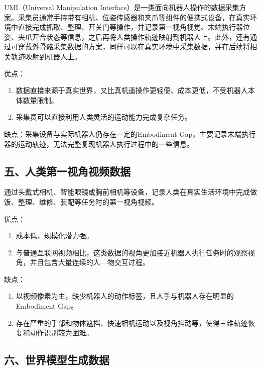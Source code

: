 UMI（Universal Manipulation Interface）是一类面向机器人操作的数据采集方案。采集员通常手持带有相机、位姿传感器和夹爪等组件的便携式设备，在真实环境中直接完成抓取、整理、开关门等操作，并记录第一视角视觉、末端执行器位姿、夹爪开合状态等信息，之后再将人类操作轨迹映射到机器人上。此外，还有通过可穿戴外骨骼采集数据的方案，同样可以在真实环境中采集数据，并在后续将相关轨迹映射到机器人上。

优点：

\begin{enumerate}
\def\labelenumi{\arabic{enumi}.}
\item
  数据直接来源于真实世界，又比真机遥操作更轻便、成本更低，不受机器人本体数量限制。
\item
  采集员可以直接利用人类灵活的运动能力完成复杂任务。
\end{enumerate}

缺点：采集设备与实际机器人仍存在一定的Embodiment Gap，主要记录末端执行器的运动轨迹，无法完整复现机器人执行过程中的一些信息。

\hypertarget{ux4e94ux4ebaux7c7bux7b2cux4e00ux89c6ux89d2ux89c6ux9891ux6570ux636e}{%
\subsection{五、人类第一视角视频数据}\label{ux4e94ux4ebaux7c7bux7b2cux4e00ux89c6ux89d2ux89c6ux9891ux6570ux636e}}

通过头戴式相机、智能眼镜或胸前相机等设备，记录人类在真实生活环境中完成做饭、整理、维修、装配等任务时的第一视角视频。

优点：

\begin{enumerate}
\def\labelenumi{\arabic{enumi}.}
\item
  成本低，规模化潜力强。
\item
  与普通互联网视频相比，这类数据的视角更加接近机器人执行任务时的观察视角，并且包含大量连续的人---物交互过程。
\end{enumerate}

缺点：

\begin{enumerate}
\def\labelenumi{\arabic{enumi}.}
\item
  以视频像素为主，缺少机器人的动作标签，且人手与机器人存在明显的Embodiment Gap。
\item
  存在严重的手部和物体遮挡、快速相机运动以及视角抖动等，使得三维轨迹恢复和动作识别较为困难。
\end{enumerate}

\hypertarget{ux516dux4e16ux754cux6a21ux578bux751fux6210ux6570ux636e}{%
\subsection{六、世界模型生成数据}\label{ux516dux4e16ux754cux6a21ux578bux751fux6210ux6570ux636e}}

